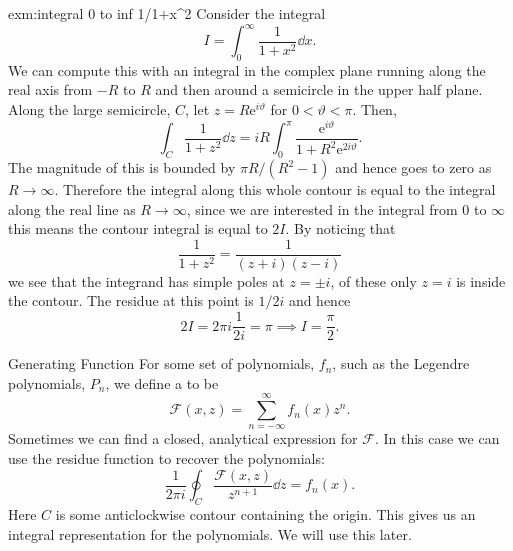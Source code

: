 \documentclass[fleqn]{NotesClass}
\newcommand*{\e}{\mathrm{e}}
\begin{document}
    \begin{exm}{}{exm:integral 0 to inf 1/1+x^2}
        Consider the integral
        \begin{equation}
            I = \int_0^{\infty} \frac{1}{1 + x^2}\dd{x}.
        \end{equation}
        We can compute this with an integral in the complex plane running along the real axis from \(-R\) to \(R\) and then around a semicircle in the upper half plane.
        Along the large semicircle, \(C\), let \(z = R\e^{i\vartheta}\) for \(0 < \vartheta < \pi\).
        Then,
        \begin{equation}
            \int_C \frac{1}{1 + z^2} \dd{z} = iR\int_0^\pi \frac{\e^{i\vartheta}}{1 + R^2\e^{2i\vartheta}}.
        \end{equation}
        The magnitude of this is bounded by \(\pi R/(R^2 - 1)\) and hence goes to zero as \(R \to \infty\).
        Therefore the integral along this whole contour is equal to the integral along the real line as \(R \to \infty\), since we are interested in the integral from 0 to \(\infty\) this means the contour integral is equal to \(2I\).
        By noticing that
        \begin{equation}
            \frac{1}{1 + z^2} = \frac{1}{(z + i)(z - i)}
        \end{equation}
        we see that the integrand has simple poles at \(z = \pm i\), of these only \(z = i\) is inside the contour.
        The residue at this point is \(1/2i\) and hence
        \begin{equation}
            2I = 2\pi i\frac{1}{2i} = \pi \implies I = \frac{\pi}{2}.
        \end{equation}
    \end{exm}
    
    \begin{exm}{Generating Function}{}
        For some set of polynomials, \(f_n\), such as the Legendre polynomials, \(P_n\), we define a  to be
        \begin{equation}
            \mathcal{F}(x, z) = \sum_{n=-\infty}^{\infty} f_n(x)z^n.
        \end{equation}
        Sometimes we can find a closed, analytical expression for \(\mathcal{F}\).
        In this case we can use the residue function to recover the polynomials:
        \begin{equation}
            \frac{1}{2\pi i} \oint_C \frac{\mathcal{F}(x, z)}{z^{n+1}}\dd{z} = f_n(x).
        \end{equation}
        Here \(C\) is some anticlockwise contour containing the origin.
        This gives us an integral representation for the polynomials.
        We will use this later.
    \end{exm}
    
\end{document}
